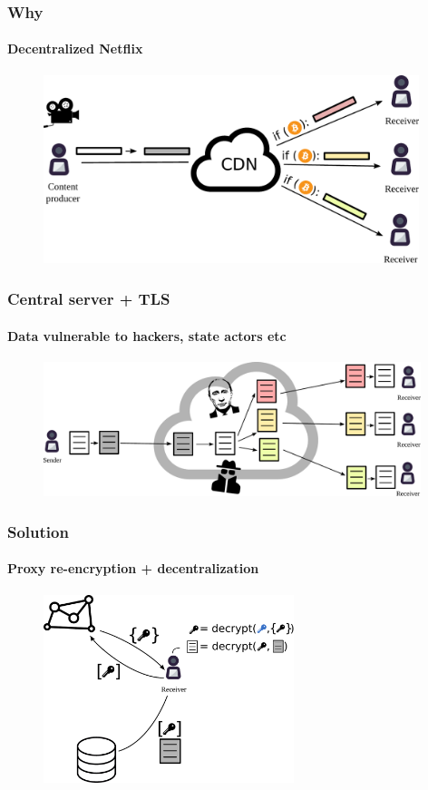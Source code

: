 \documentclass[xetex,mathsans,sans,aspectratio=169]{beamer}
\begin{document}
    \begin{frame}
        \frametitle{Why}
        \framesubtitle{Decentralized Netflix}
        \begin{figure}
            \centering
            \includegraphics[height=5.5cm]{pdf/streams.pdf}
        \end{figure}
    \end{frame}

    \begin{frame}
        \frametitle{Central server + TLS}
        \framesubtitle{Data vulnerable to hackers, state actors etc}
        \begin{figure}
            \centering
            \includegraphics[width=11cm]{pdf/file-sharing-tls.pdf}
        \end{figure}
    \end{frame}

    \begin{frame}
        \frametitle{Solution}
        \framesubtitle{Proxy re-encryption + decentralization}
        \begin{figure}
            \centering
            \includegraphics[height=5.5cm]{pdf/pre-kms.pdf}
        \end{figure}
    \end{frame}
\end{document}
